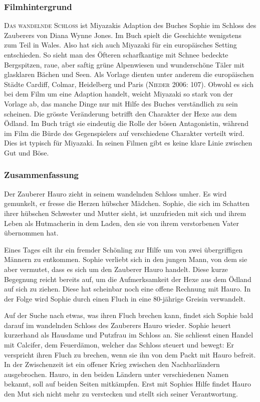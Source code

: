 \subsubsection{Filmhintergrund} 
\textsc{Das wandelnde Schloss} ist Miyazakis Adaption des Buches \glqq Sophie im Schloss des Zauberers \grqq von Diana Wynne Jones. Im Buch spielt die Geschichte wenigstens zum Teil in Wales. Also hat sich auch Miyazaki für ein europäisches Setting entschieden. So sieht man des Öfteren scharfkantige mit Schnee bedeckte Bergspitzen, raue, aber saftig grüne Alpenwiesen und wunderschöne Täler mit glasklaren Bächen und Seen. Als Vorlage dienten unter anderem die europäischen Städte Cardiff, Colmar, Heidelberg und Paris (\textsc{Nieder} 2006: 107). Obwohl es sich bei dem Film um eine Adaption handelt, weicht Miyazaki so stark von der Vorlage ab, das manche Dinge nur mit Hilfe des Buches verständlich zu sein scheinen. 
Die grösste Veränderung betrifft den Charakter der Hexe aus dem Ödland. Im Buch trägt sie eindeutig die Rolle der bösen Antagonistin, während im Film die Bürde des Gegenspielers auf verschiedene Charakter verteilt wird. Dies ist typisch für Miyazaki. In seinen Filmen gibt es keine klare Linie zwischen Gut und Böse. 

\subsubsection{Zusammenfassung} 
Der Zauberer Hauro zieht in seinem wandelnden Schloss umher. Es wird gemunkelt, er fresse die Herzen hübscher Mädchen. Sophie, die sich im Schatten ihrer hübschen Schwester und Mutter sieht, ist unzufrieden mit sich und ihrem Leben als Hutmacherin in dem Laden, den sie von ihrem verstorbenen Vater übernommen hat.

Eines Tages eilt ihr ein fremder Schönling zur Hilfe um von zwei übergriffigen Männern zu entkommen. Sophie verliebt sich in den jungen Mann, von dem sie aber vermutet, dass es sich um den Zauberer Hauro handelt. Diese kurze Begegnung reicht bereits auf, um die Aufmerksamkeit der Hexe aus dem Ödland auf sich zu ziehen. Diese hat scheinbar noch eine offene Rechnung mit Hauro. In der Folge wird Sophie durch einen Fluch in eine 80-jährige Greisin verwandelt. 

Auf der Suche nach etwas, was ihren Fluch brechen kann, findet sich Sophie bald darauf im wandelnden Schloss des Zauberers Hauro wieder. Sophie heuert kurzerhand als Hausdame und Putzfrau im Schloss an. Sie schliesst einen Handel mit Calcifer, dem Feuerdämon, welcher das Schloss steuert und bewegt: Er verspricht ihren Fluch zu brechen, wenn sie ihn von dem Packt mit Hauro befreit. In der Zwischenzeit ist ein offener Krieg zwischen den Nachbarländern ausgebrochen. Hauro, in den beiden Ländern unter verschiedenen Namen bekannt, soll auf beiden Seiten mitkämpfen. Erst mit Sophies Hilfe findet Hauro den Mut sich nicht mehr zu verstecken und stellt sich seiner Verantwortung. 

